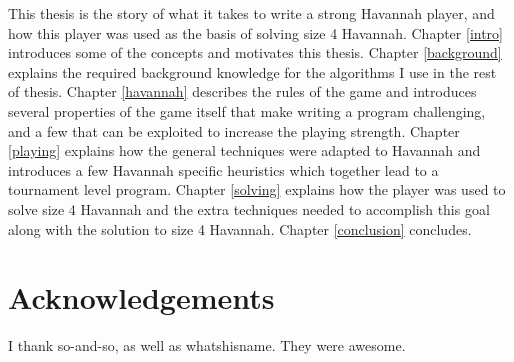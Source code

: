 This thesis is the story of what it takes to write a strong Havannah player, and how this player was used as the basis of solving size 4 Havannah. Chapter \ref{intro} introduces some of the concepts and motivates this thesis. Chapter \ref{background} explains the required background knowledge for the algorithms I use in the rest of thesis. Chapter \ref{havannah} describes the rules of the game and introduces several properties of the game itself that make writing a program challenging, and a few that can be exploited to increase the playing strength. Chapter \ref{playing} explains how the general techniques were adapted to Havannah and introduces a few Havannah specific heuristics which together lead to a tournament level program. Chapter \ref{solving} explains how the player was used to solve size 4 Havannah and the extra techniques needed to accomplish this goal along with the solution to size 4 Havannah. Chapter \ref{conclusion} concludes.



  \newpage
   \chapter*{Acknowledgements}
   \thispagestyle{empty}
   \vspace*{-0.7in}
   \small{
  I thank so-and-so, as well as whatshisname. They were awesome.
  }


